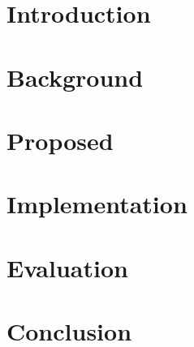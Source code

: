 
\chapter{Introduction}\label{chapter:introduction}
\graphicspath{{Manuscript/}}


%

\chapter{Background}\label{chapter:related}
\graphicspath{{Manuscript/}}


\chapter{Proposed}\label{chapter:proposed}
\graphicspath{{Manuscript/}}




\chapter{Implementation}\label{chapter:implemetation}
\graphicspath{{Manuscript/}}




\chapter{Evaluation}\label{chapter:evaluation}
\graphicspath{{Manuscript/}}



\chapter{Conclusion}\label{chapter:conclusion}
\graphicspath{{Manuscript/}}


